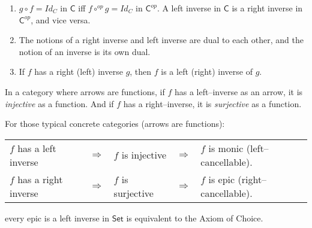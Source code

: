 \begin{center}
\end{center}


\begin{remark}
	\begin{enumerate}[itemsep=5pt,parsep=5pt,leftmargin=2em,topsep=5pt,label=(\alph*)] %
		\item 
		$g \circ f = Id_C$ in $\mathsf{C}$ iff $f \circ^{op} g = Id_C$ in $\mathsf{C}^{op}$.
		A left inverse in $\mathsf{C}$ is a right inverse in $\mathsf{C}^{op}$, and vice versa. 

		\item 
		The notions of a right inverse and left inverse are dual to each other, 
		and the notion of an inverse is its own dual.

		\item 
		If $f$ has a right (left) inverse $g$, 
		then $f$ is a left (right) inverse of $g$.
	\end{enumerate}
\end{remark}


\begin{thm}
	In a category where arrows are functions, 
	if $f$ has a left--inverse as an arrow, it is \textit{injective} as a function. 
	And if $f$ has a right--inverse, it is \textit{surjective} as a function.
\end{thm}


For those typical concrete categories (arrows are functions): 

\begin{center}
\begin{tabular}{lllll}
	$f$ has a left inverse & 
	$\Rightarrow$ & 
	$f$ is injective & 
	$\Rightarrow$ & 
	$f$ is monic (left--cancellable).  \\

	$f$ has a right inverse & 
	$\Rightarrow$ & 
	$f$ is surjective & 
	$\Rightarrow$ & 
	$f$ is epic (right--cancellable).  \\	
\end{tabular}
\end{center}






every epic is a left inverse in $\mathsf{Set}$ is equivalent to the {\color{teal} Axiom of Choice}.





